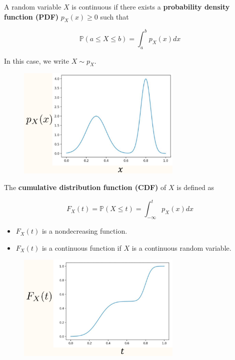 \begin{concept}
    A random variable $X$ is continuous if there exists a \textbf{probability density function (PDF)} $p_{X}(x) \geq 0$ such that

    $$
    \mathbb{P}(a \leq X \leq b)=\int_{a}^{b} p_{X}(x) d x
    $$

    In this case, we write $X \sim p_{X}$.

    \begin{figure}[H]
        \centering
        \includegraphics[width=0.7\textwidth]{.././assets/10.3.png}
    \end{figure}

    \par\noindent\textcolor{gray}{\hdashrule{\textwidth}{0.4pt}{1pt 2pt}}

    The \textbf{cumulative distribution function (CDF)} of $X$ is defined as

    $$
    F_{X}(t)=\mathbb{P}(X \leq t)=\int_{-\infty}^{t} p_{X}(x) d x
    $$

    \begin{itemize}
        \item $F_{X}(t)$ is a nondecreasing function.\\
        \item $F_{X}(t)$ is a continuous function if $X$ is a continuous random variable.
    \end{itemize}

    \begin{figure}[H]
        \centering
        \includegraphics[width=0.7\textwidth]{.././assets/10.4.png}
    \end{figure}
\end{concept}

